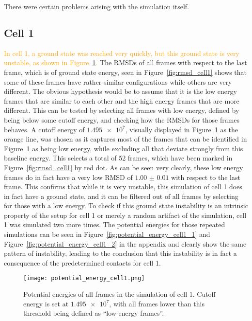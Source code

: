 There were certain problems arising with the simulation itself.

\subsection{Cell 1} %
\label{sub:cell_1}

\textcolor{orange}{In cell 1, a ground state was reached very quickly, but this ground state is very unstable, as shown in Figure~\ref{fig:potential_energy_cell1}.} The RMSDs of all frames with respect to the last frame, which is of ground state energy, seen in Figure~\ref{fig:rmsd_cell1} shows that some of these frames have rather similar configurations while others are very different. The obvious hypothesis would be to assume that it is the low energy frames that are similar to each other and the high energy frames that are more different. This can be tested by selecting all frames with low energy, defined by being below some cutoff energy, and checking how the RMSDs for those frames behaves. A cutoff energy of \(\num{1.495e7}\), visually displayed in Figure~\ref{fig:potential_energy_cell1} as the orange line, was chosen as it captures most of the frames that can be identified in Figure~\ref{fig:potential_energy_cell1} as being low energy, while excluding all that deviate strongly from this baseline energy. This selects a total of 52 frames, which have been marked in Figure~\ref{fig:rmsd_cell1} by red dot. As can be seen very clearly, these low energy frames do in fact have a very low RMSD of \(\num{1.00(1)}\) with respect to the last frame. This confirms that while it is very unstable, this simulation of cell 1 does in fact have a ground state, and it can be filtered out of all frames by selecting for those with a low energy. To check if this ground state instability is an intrinsic property of the setup for cell 1 or merely a random artifact of the simulation, cell 1 was simulated two more times. The potential energies for those repeated simulations can be seen in Figure~\ref{fig:potential_energy_cell1_1} and Figure~\ref{fig:potential_energy_cell1_2} in the appendix and clearly show the same pattern of instability, leading to the conclusion that this instability is in fact a consequence of the predetermined contacts for cell 1.

\begin{figure}[ht]
\centering
  \texttt{[image: potential\_energy\_cell1.png]}
  \caption{Potential energies of all frames in the simulation of cell 1. Cutoff energy is set at \(\num{1.495e7}\), with all frames lower than this threshold being defined as \enquote{low-energy frames}.}
  \label{fig:potential_energy_cell1}
\end{figure}


